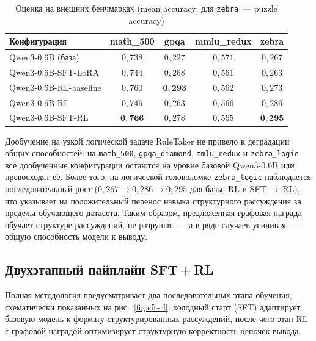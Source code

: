 \begin{table}[htbp]
\centering
\caption{Оценка на внешних бенчмарках (mean accuracy; для \texttt{zebra}~--- puzzle accuracy)}
\label{tab:generalization}
\small
\begin{tabular}{|l|c|c|c|c|}
\hline
\textbf{Конфигурация} & \textbf{math\_500} & \textbf{gpqa} & \textbf{mmlu\_redux} & \textbf{zebra} \\
\hline
Qwen3-0.6B (база)        & $0{,}738$ & $0{,}227$ & $0{,}571$ & $0{,}267$ \\
\hline
Qwen3-0.6B-SFT-LoRA      & $0{,}744$ & $0{,}268$ & $0{,}561$ & $0{,}263$ \\
\hline
Qwen3-0.6B-RL-baseline   & $0{,}760$ & $\mathbf{0{,}293}$ & $0{,}562$ & $0{,}273$ \\
\hline
Qwen3-0.6B-RL            & $0{,}746$ & $0{,}263$ & $0{,}566$ & $0{,}286$ \\
\hline
Qwen3-0.6B-SFT-RL        & $\mathbf{0{,}766}$ & $0{,}278$ & $0{,}565$ & $\mathbf{0{,}295}$ \\
\hline
\end{tabular}
\end{table}

Дообучение на узкой логической задаче RuleTaker не привело к деградации общих способностей: на \texttt{math\_500}, \texttt{gpqa\_diamond}, \texttt{mmlu\_redux} и \texttt{zebra\_logic} все дообученные конфигурации остаются на уровне базовой Qwen3-0.6B или превосходят её. Более того, на логической головоломке \texttt{zebra\_logic} наблюдается последовательный рост ($0{,}267 \to 0{,}286 \to 0{,}295$ для базы, RL и SFT\,$\to$\,RL), что указывает на положительный перенос навыка структурного рассуждения за пределы обучающего датасета. Таким образом, предложенная графовая награда обучает структуре рассуждений, не разрушая~--- а в ряде случаев усиливая~--- общую способность модели к выводу.

\subsection{Двухэтапный пайплайн SFT\,+\,RL}
\label{subsec:impl-sft-rl}

Полная методология предусматривает два последовательных этапа обучения, схематически показанных на рис.~\ref{fig:sft-rl}: холодный старт (SFT) адаптирует базовую модель к формату структурированных рассуждений, после чего этап RL с графовой наградой оптимизирует структурную корректность цепочек вывода.

